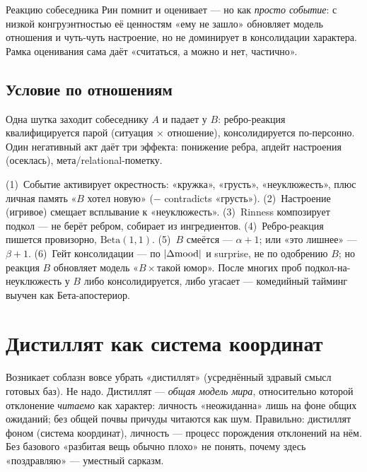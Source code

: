 Реакцию собеседника Рин помнит и оценивает — но как \emph{просто событие}: с низкой
конгруэнтностью её ценностям «ему не зашло» обновляет модель отношения и чуть-чуть
настроение, но не доминирует в консолидации характера. Рамка оценивания сама даёт
«считаться, а можно и нет, частично».

\subsection{Условие по отношениям}

Одна шутка заходит собеседнику $A$ и падает у $B$: ребро-реакция квалифицируется
парой (ситуация $\times$ отношение), консолидируется по-персонно. Один негативный
акт даёт три эффекта: понижение ребра, апдейт настроения (осеклась),
мета/relational-пометку.

\begin{workedbox}
(1)~Событие активирует окрестность: «кружка», «грусть», «неуклюжесть», плюс личная
память «$B$ хотел новую» ($-$ contradicts «грусть»). (2)~Настроение (игривое)
смещает всплывание к «неуклюжесть». (3)~Rinness композирует подкол — не берёт ребром,
собирает из ингредиентов. (4)~Ребро-реакция пишется провизорно,
$\mathrm{Beta}(1,1)$. (5)~$B$ смеётся — $\alpha\!+\!1$; или «это лишнее» —
$\beta\!+\!1$. (6)~Гейт консолидации — по $|\Delta\mathrm{mood}|$ и surprise, не по одобрению
$B$; но реакция $B$ обновляет модель «$B\times$такой юмор». После многих проб
подкол-на-неуклюжесть у $B$ либо консолидируется, либо угасает — комедийный тайминг
выучен как Бета-апостериор.
\end{workedbox}

\section{Дистиллят как система координат}

Возникает соблазн вовсе убрать «дистиллят» (усреднённый здравый смысл готовых баз).
Не надо. Дистиллят — \emph{общая модель мира}, относительно которой отклонение
\emph{читаемо} как характер: личность «неожиданна» лишь на фоне общих ожиданий; без
общей почвы причуды читаются как шум. Правильно: дистиллят фоном (система координат),
личность — процесс порождения отклонений на нём. Без базового «разбитая вещь обычно
плохо» не понять, почему здесь «поздравляю» — уместный сарказм.
